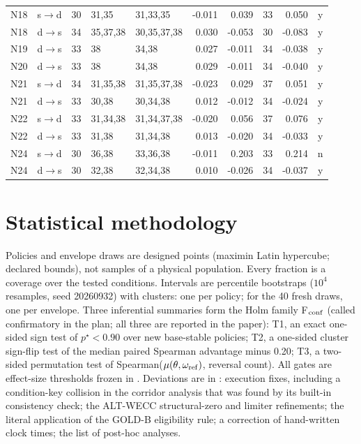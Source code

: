 \documentclass[10pt,a4paper]{article}
\begin{document}
{\begin{longtable}{llcllrrcrc}
N18 & s$\to$d & 30 & 31,35 & 31,33,35 & -0.011 & 0.039 & 33 & 0.050 & y \\
N18 & d$\to$s & 34 & 35,37,38 & 30,35,37,38 & 0.030 & -0.053 & 30 & -0.083 & y \\
N19 & d$\to$s & 33 & 38 & 34,38 & 0.027 & -0.011 & 34 & -0.038 & y \\
N20 & d$\to$s & 33 & 38 & 34,38 & 0.029 & -0.011 & 34 & -0.040 & y \\
N21 & s$\to$d & 34 & 31,35,38 & 31,35,37,38 & -0.023 & 0.029 & 37 & 0.051 & y \\
N21 & d$\to$s & 33 & 30,38 & 30,34,38 & 0.012 & -0.012 & 34 & -0.024 & y \\
N22 & s$\to$d & 33 & 31,34,38 & 31,34,37,38 & -0.020 & 0.056 & 37 & 0.076 & y \\
N22 & d$\to$s & 33 & 31,38 & 31,34,38 & 0.013 & -0.020 & 34 & -0.033 & y \\
N24 & s$\to$d & 30 & 36,38 & 33,36,38 & -0.011 & 0.203 & 33 & 0.214 & n \\
N24 & d$\to$s & 30 & 32,38 & 32,34,38 & 0.010 & -0.026 & 34 & -0.037 & y \\
\bottomrule
\end{longtable}}


\section{Statistical methodology}
Policies and envelope draws are designed points (maximin Latin hypercube; declared bounds), not samples of a physical
population. Every fraction is a coverage over the tested conditions. Intervals are percentile bootstraps ($10^4$
resamples, seed 20260932) with clusters: one per policy; for the 40 fresh draws, one per envelope. Three inferential
summaries form the Holm family F$_{\rm conf}$ (called confirmatory in the plan; all three are reported in the paper): T1, an exact one-sided sign test of $p^\star<0.90$ over new
base-stable policies; T2, a one-sided cluster sign-flip test of the median paired Spearman advantage minus 0.20;
T3, a two-sided permutation test of Spearman($\mu(\theta,\omega_{\rm ref})$, reversal count). All gates are
effect-size thresholds frozen in . Deviations are in
:
execution fixes, including a condition-key collision in the corridor analysis that was found by its built-in consistency check;
the ALT-WECC structural-zero and limiter refinements;
the literal application of the GOLD-B eligibility rule;
a correction of hand-written clock times;
the list of post-hoc analyses.
\end{document}
